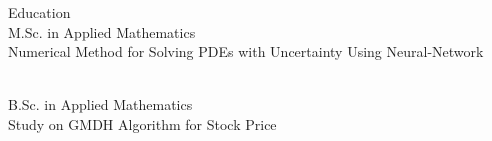 \begin{rSection}{Education}
	 \\%
	M.Sc. in Applied Mathematics \smallskip \\
	Numerical Method for Solving PDEs with Uncertainty Using Neural-Network 
	
	\\ %
	B.Sc. in Applied Mathematics \smallskip \\
	Study on GMDH Algorithm for Stock Price
\end{rSection}